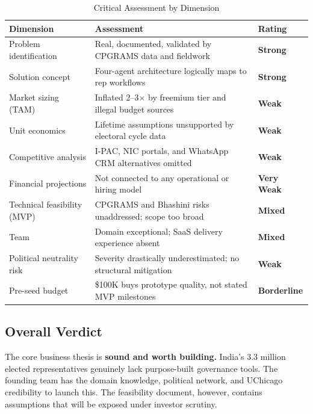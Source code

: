 \documentclass[12pt, a4paper]{article}
\newcommand{\strength}[1]{\textcolor{okgreen}{\textbf{#1}}}
\newcommand{\weakness}[1]{\textcolor{critred}{\textbf{#1}}}
\newcommand{\caution}[1]{\textcolor{warnorange}{\textbf{#1}}}
\begin{document}
\begin{table}[h!]
\centering
\caption{Critical Assessment by Dimension}
\renewcommand{\arraystretch}{1.5}
\begin{tabularx}{\textwidth}{lXl}
\toprule
\rowcolor{rowblue}
\textbf{Dimension} & \textbf{Assessment} & \textbf{Rating} \\
\midrule
Problem identification       & Real, documented, validated by CPGRAMS data and fieldwork & \strength{Strong} \\
\midrule
Solution concept             & Four-agent architecture logically maps to rep workflows & \strength{Strong} \\
\midrule
Market sizing (TAM)          & Inflated 2--3$\times$ by freemium tier and illegal budget sources & \weakness{Weak} \\
\midrule
Unit economics               & Lifetime assumptions unsupported by electoral cycle data & \weakness{Weak} \\
\midrule
Competitive analysis         & I-PAC, NIC portals, and WhatsApp CRM alternatives omitted & \weakness{Weak} \\
\midrule
Financial projections        & Not connected to any operational or hiring model & \weakness{Very Weak} \\
\midrule
Technical feasibility (MVP)  & CPGRAMS and Bhashini risks unaddressed; scope too broad & \caution{Mixed} \\
\midrule
Team                         & Domain exceptional; SaaS delivery experience absent & \caution{Mixed} \\
\midrule
Political neutrality risk    & Severity drastically underestimated; no structural mitigation & \weakness{Weak} \\
\midrule
Pre-seed budget              & \$100K buys prototype quality, not stated MVP milestones & \caution{Borderline} \\
\bottomrule
\end{tabularx}
\end{table}

\subsection*{Overall Verdict}

The core business thesis is \textbf{sound and worth building.} India's 3.3 million elected representatives genuinely lack purpose-built governance tools. The founding team has the domain knowledge, political network, and UChicago credibility to launch this. The feasibility document, however, contains assumptions that will be exposed under investor scrutiny.
\end{document}

